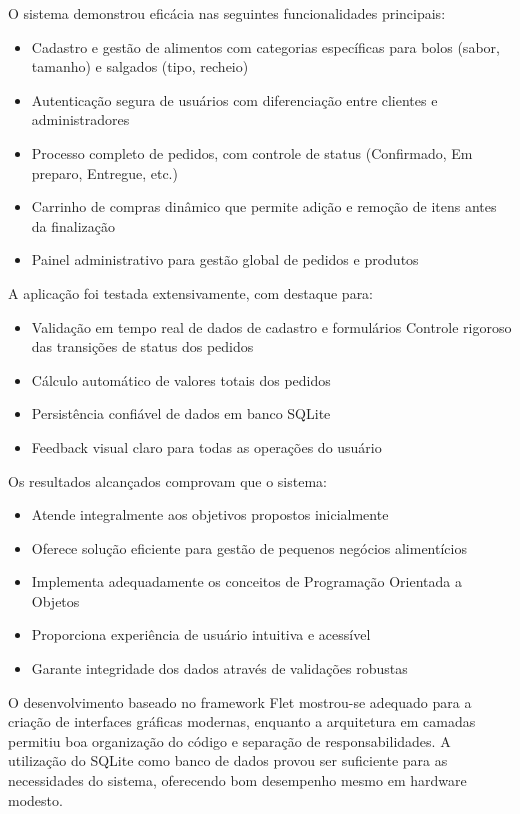 \documentclass[conference]{IEEEtran}
\begin{document}
O sistema demonstrou eficácia nas seguintes funcionalidades principais:

\begin{itemize}
    \item Cadastro e gestão de alimentos com categorias específicas para bolos (sabor, tamanho) e salgados (tipo, recheio)
    \item Autenticação segura de usuários com diferenciação entre clientes e administradores
    \item Processo completo de pedidos, com controle de status (Confirmado, Em preparo, Entregue, etc.)
    \item Carrinho de compras dinâmico que permite adição e remoção de itens antes da finalização
    \item Painel administrativo para gestão global de pedidos e produtos
\end{itemize}

A aplicação foi testada extensivamente, com destaque para:

\begin{itemize}
    \item Validação em tempo real de dados de cadastro e formulários
    \interface{} Controle rigoroso das transições de status dos pedidos
    \item Cálculo automático de valores totais dos pedidos
    \item Persistência confiável de dados em banco SQLite
    \item Feedback visual claro para todas as operações do usuário
\end{itemize}

Os resultados alcançados comprovam que o sistema:

\begin{itemize}
    \item Atende integralmente aos objetivos propostos inicialmente
    \item Oferece solução eficiente para gestão de pequenos negócios alimentícios
    \item Implementa adequadamente os conceitos de Programação Orientada a Objetos
    \item Proporciona experiência de usuário intuitiva e acessível
    \item Garante integridade dos dados através de validações robustas
\end{itemize}

O desenvolvimento baseado no framework Flet mostrou-se adequado para a criação de interfaces gráficas modernas, enquanto a arquitetura em camadas permitiu boa organização do código e separação de responsabilidades. A utilização do SQLite como banco de dados provou ser suficiente para as necessidades do sistema, oferecendo bom desempenho mesmo em hardware modesto.
\end{document}
